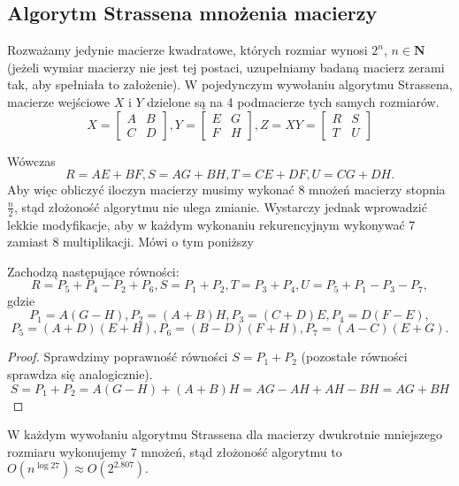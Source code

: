 \subsection{Algorytm Strassena mnożenia macierzy}
Rozważamy jedynie macierze kwadratowe, których rozmiar wynosi $2^n$, $n \in
\mathbf{N}$ (jeżeli wymiar macierzy nie jest tej postaci, uzupełniamy badaną
macierz zerami tak, aby spełniała to założenie). W pojedynczym wywołaniu
algorytmu Strassena, macierze wejściowe $X$ i $Y$ dzielone są na 4 podmacierze
tych samych rozmiarów.
$$X=\begin{bmatrix} A & B \\ C & D \end{bmatrix},	
Y=\begin{bmatrix} E & G \\ F & H \end{bmatrix},		
Z=XY=\begin{bmatrix} R & S \\ T & U \end{bmatrix}$$

Wówczas
$$ R=AE+BF, S=AG+BH, T=CE+DF, U=CG+DH.$$
Aby więc obliczyć iloczyn macierzy musimy wykonać 8 mnożeń macierzy stopnia
$\frac{n}{2}$, stąd złożoność algorytmu nie ulega zmianie. Wystarczy jednak
wprowadzić lekkie modyfikacje, aby  w każdym wykonaniu rekurencyjnym wykonywać
7 zamiast 8 multiplikacji. Mówi o tym poniższy
\begin{lm}{Zachodzą następujące równości:
$$R=P_5+P_4-P_2+P_6, S=P_1+P_2, T=P_3+P_4, U=P_5+P_1-P_3-P_7,$$
gdzie
$$P_1=A(G-H), P_2=(A+B)H, P_3=(C+D)E, P_4=D(F-E),$$
$$P_5=(A+D)(E+H), P_6=(B-D)(F+H), P_7 = (A-C)(E+G).$$}
\end{lm}
\begin{proof}
Sprawdzimy poprawność równości $S=P_1+P_2$ (pozostałe równości sprawdza się
analogicznie).
$$S=P_1+P_2=A(G-H)+(A+B)H=AG-AH+AH-BH=AG+BH$$
\end{proof}
W każdym wywołaniu algorytmu Strassena dla macierzy dwukrotnie mniejszego
rozmiaru wykonujemy 7 mnożeń, stąd złożoność algorytmu to $O(n^{\log{2}{7}})
\approx O(2^{2.807}).$
